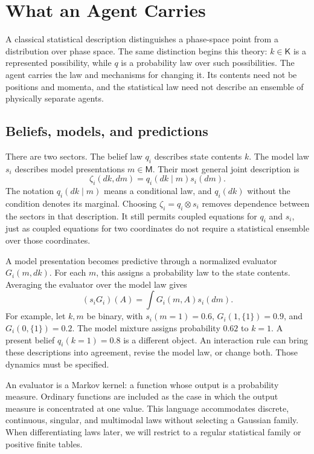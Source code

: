 \chapter{What an Agent Carries}
\label{comp:objects}

A classical statistical description distinguishes a phase-space point from a distribution over phase space. The same distinction begins this theory: $k\in\mathsf K$ is a represented possibility, while $q$ is a probability law over such possibilities. The agent carries the law and mechanisms for changing it. Its contents need not be positions and momenta, and the statistical law need not describe an ensemble of physically separate agents.

\section{Beliefs, models, and predictions}

There are two sectors. The belief law $q_i$ describes state contents $k$. The model law $s_i$ describes model presentations $m\in\mathsf M$. Their most general joint description is
\begin{equation}
\zeta_i(dk,dm)=q_i(dk\mid m)s_i(dm).
\label{comp:eq-joint}
\end{equation}
The notation $q_i(dk\mid m)$ means a conditional law, and $q_i(dk)$ without the condition denotes its marginal. Choosing $\zeta_i=q_i\otimes s_i$ removes dependence between the sectors in that description. It still permits coupled equations for $q_i$ and $s_i$, just as coupled equations for two coordinates do not require a statistical ensemble over those coordinates.

A model presentation becomes predictive through a normalized evaluator $G_i(m,dk)$. For each $m$, this assigns a probability law to the state contents. Averaging the evaluator over the model law gives
\begin{equation}
(s_iG_i)(A)=\int G_i(m,A)s_i(dm).
\label{comp:eq-model-mixture}
\end{equation}
For example, let $k,m$ be binary, with $s_i(m=1)=0.6$, $G_i(1,\{1\})=0.9$, and $G_i(0,\{1\})=0.2$. The model mixture assigns probability $0.62$ to $k=1$. A present belief $q_i(k=1)=0.8$ is a different object. An interaction rule can bring these descriptions into agreement, revise the model law, or change both. Those dynamics must be specified.

An evaluator is a Markov kernel: a function whose output is a probability measure. Ordinary functions are included as the case in which the output measure is concentrated at one value. This language accommodates discrete, continuous, singular, and multimodal laws without selecting a Gaussian family. When differentiating laws later, we will restrict to a regular statistical family or positive finite tables.

